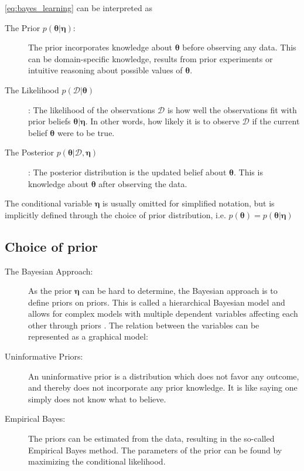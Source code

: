 \cref{eq:bayes_learning} can be interpreted as
\begin{description}
    \item[The Prior $p(\boldsymbol{\theta} | \boldsymbol{\eta})$:] The prior incorporates knowledge about $\boldsymbol{\theta}$ before observing any data. This can be domain-specific knowledge, results from prior experiments or intuitive reasoning about possible values of $\boldsymbol{\theta}$. 
    \item[The Likelihood $p(\mathcal{D} | \boldsymbol{\theta})$]: The likelihood of the observations $\mathcal{D}$ is how well the observations fit with prior beliefs $\boldsymbol{\theta} | \boldsymbol{\eta}$. In other words, how likely it is to observe $\mathcal{D}$ if the current belief $\boldsymbol{\theta}$ were to be true.
    \item[The Posterior $p(\boldsymbol{\theta} | \mathcal{D}, \boldsymbol{\eta})$]: The posterior distribution is the updated belief about $\boldsymbol{\theta}$. This is knowledge about $\boldsymbol{\theta}$ after observing the data. 
\end{description}

The conditional variable $\boldsymbol{\eta}$ is usually omitted for simplified notation, but is implicitly defined through the choice of prior distribution, i.e. $p(\boldsymbol{\theta}) = p(\boldsymbol{\theta} | \boldsymbol{\eta})$


\subsection{Choice of prior}

\begin{description}
\item[The Bayesian Approach:]As the prior $\boldsymbol{\eta}$ can be hard to determine, the Bayesian approach is to define priors on priors. This is called a hierarchical Bayesian model and allows for complex models with multiple dependent variables affecting each other through priors \cite{murphy}. The relation between the variables can be represented as a graphical model:

\begin{figure*}[h!]
\centering    
{}
\end{figure*}

\item[Uninformative Priors:] An uninformative prior is a distribution which does not favor any outcome, and thereby does not incorporate any prior knowledge. It is like saying one simply does not know what to believe.
\item[Empirical Bayes:] The priors can be estimated from the data, resulting in the so-called Empirical Bayes method. The parameters of the prior can be found by maximizing the conditional likelihood. %
\end{description}



